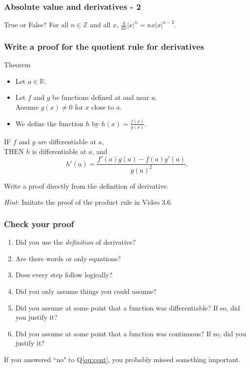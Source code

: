 \begin{frame}[t]
	\frametitle{Absolute value and derivatives - 2}

	\begin{block}{True or False?}
		For all $n \in \mathbb{Z}$ and all $x$, $\frac{d}{dx}|x|^{n}=nx|x|^{n-2}$.
	\end{block}
\end{frame}

\begin{frame}[t]
	\fontsize{13}{13}\selectfont
	\frametitle{Write a proof for the quotient rule for derivatives}

	\begin{block}{Theorem}
		\begin{itemize}
			\item Let $a \in \mathbb{R}$.

			\item Let $f$ and $g$ be functions defined at and near $a$. \\ Assume
				$g(x) \neq 0$ for $x$ close to $a$.

			\item We define the function $h$ by $\displaystyle h(x) = \frac{f(x)}{g(x)}$.
		\end{itemize}

		IF $f$ and $g$ are differentiable at $a$, \\ THEN $h$ is differentiable at $a$,
		and
		\[
			h'(a) = \frac{f'(a) g(a) - f(a) g'(a)}{g(a)^{2}}.
		\]
	\end{block}

	\vfill

	Write a proof directly from the definition of derivative.

	\emph{Hint:} Imitate the proof of the product rule in Video 3.6.
\end{frame}

\begin{frame}[t]
	\frametitle{Check your proof}

	\begin{enumerate}
		\item Did you use the \emph{definition} of derivative?

		\item Are there words or only equations?

		\item Does every step follow logically?

		\item Did you only assume things you could assume?

		\item Did you assume at some point that a function was differentiable? If so,
			did you justify it?

		\item \label{qu:cont} Did you assume at some point that a function was continuous?
			If so, did you justify it?
	\end{enumerate}

	If you answered ``no" to Q\ref{qu:cont}, you probably missed something
	important.
\end{frame}

